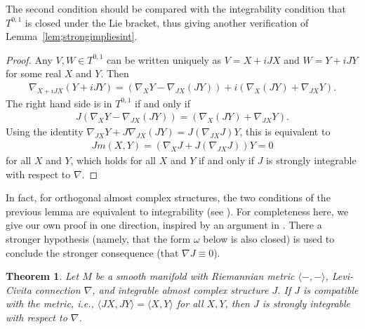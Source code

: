\documentclass[10pt,a4paper]{amsart}
\newtheorem{thm}{Theorem}[section]
\numberwithin{equation}{section}
\begin{document}
The second condition should be compared with the integrability condition that $T^{0,1}$ is closed under the Lie bracket, thus giving another verification of Lemma~\ref{lem;strongimpliesint}.

\begin{proof}Any $V,W \in T^{0,1}$ can be written uniquely as $V = X + iJX$ and $W = Y + iJY$ for some real $X$ and $Y$. Then
\begin{gather*}
\nabla_{X+ iJX} (Y + i JY) = (\nabla_X Y - \nabla_{JX} (JY) ) + i (\nabla_X (JY) + \nabla_{JX} Y ).
\end{gather*}
The right hand side is in $ T^{0,1}$ if and only if
\begin{gather*}
J (\nabla_X Y - \nabla_{JX} (JY) ) = (\nabla_X (JY) + \nabla_{JX} Y ).
\end{gather*}
Using the identity $\nabla_{JX} Y + J\nabla_{JX} (JY) = J ( \nabla_{JX} J ) Y$, this is equivalent to
\begin{gather*}
Jm(X,Y)= ( \nabla_X J +J ( \nabla_{JX} J ) ) Y = 0
\end{gather*}
for all $X$ and $Y$, which holds for all $X$ and $Y$ if and only if $J$ is strongly integrable with respect to $\nabla$.
\end{proof}

In fact, for orthogonal almost complex structures, the two conditions of the previous lemma are equivalent to integrability (see \cite[p.~267]{S}). For completeness here, we give our own proof in one direction, inspired by an argument in \cite[Appendix~C.7]{McS}. There a stronger hypothesis (namely, that the form $\omega$ below is also closed) is used to conclude the stronger consequence (that $\nabla J \equiv 0$).

\begin{thm} \label{thm;Jintorth} Let $M$ be a smooth manifold with Riemannian metric $\langle - ,- \rangle$, Levi-Civita connection $\nabla$, and integrable almost complex structure $J$. If $J$ is compatible with the metric, i.e., $\langle JX,JY \rangle = \langle X,Y \rangle $ for all $X,Y$, then $J$ is strongly integrable with respect to $\nabla$.
\end{thm}
\end{document}
